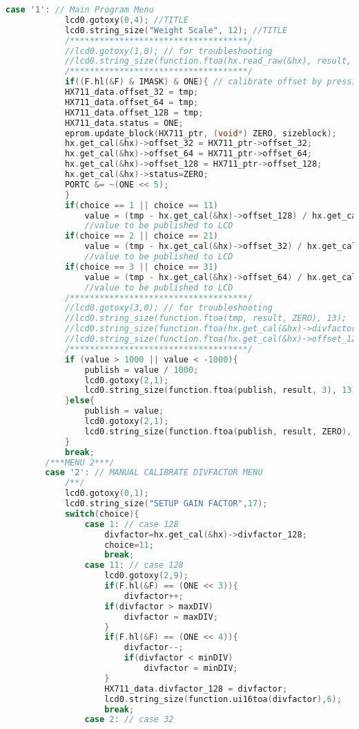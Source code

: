 \begin{lstlisting}[language=C, caption={main.c}, label=main-c, captionpos=b]
		case '1': // Main Program Menu
			lcd0.gotoxy(0,4); //TITLE
			lcd0.string_size("Weight Scale", 12); //TITLE
			/************************************/
			//lcd0.gotoxy(1,0); // for troubleshooting
			//lcd0.string_size(function.ftoa(hx.read_raw(&hx), result, ZERO), 13);
			/************************************/
			if((F.hl(&F) & IMASK) & ONE){ // calibrate offset by pressing button 1
			HX711_data.offset_32 = tmp;
			HX711_data.offset_64 = tmp;
			HX711_data.offset_128 = tmp;
			HX711_data.status = ONE;
			eprom.update_block(HX711_ptr, (void*) ZERO, sizeblock);
			hx.get_cal(&hx)->offset_32 = HX711_ptr->offset_32;
			hx.get_cal(&hx)->offset_64 = HX711_ptr->offset_64;
			hx.get_cal(&hx)->offset_128 = HX711_ptr->offset_128;
			hx.get_cal(&hx)->status=ZERO;
			PORTC &= ~(ONE << 5);
			}
			if(choice == 1 || choice == 11)
				value = (tmp - hx.get_cal(&hx)->offset_128) / hx.get_cal(&hx)->divfactor_128; 
				//value to be published to LCD
			if(choice == 2 || choice == 21)
				value = (tmp - hx.get_cal(&hx)->offset_32) / hx.get_cal(&hx)->divfactor_32; 
				//value to be published to LCD
			if(choice == 3 || choice == 31)
				value = (tmp - hx.get_cal(&hx)->offset_64) / hx.get_cal(&hx)->divfactor_64; 
				//value to be published to LCD
			/************************************/
			//lcd0.gotoxy(3,0); // for troubleshooting
			//lcd0.string_size(function.ftoa(tmp, result, ZERO), 13);
			//lcd0.string_size(function.ftoa(hx.get_cal(&hx)->divfactor_128, result, ZERO), 13);
			//lcd0.string_size(function.ftoa(hx.get_cal(&hx)->offset_128, result, ZERO), 13);
			/************************************/
			if (value > 1000 || value < -1000){
				publish = value / 1000;
				lcd0.gotoxy(2,1);
				lcd0.string_size(function.ftoa(publish, result, 3), 13); lcd0.string_size("Kg", 4);
			}else{
				publish = value;
				lcd0.gotoxy(2,1);
				lcd0.string_size(function.ftoa(publish, result, ZERO), 13); lcd0.string_size("gram", 4);
			}
			break;
		/***MENU 2***/
		case '2': // MANUAL CALIBRATE DIVFACTOR MENU
			/**/
			lcd0.gotoxy(0,1);
			lcd0.string_size("SETUP GAIN FACTOR",17);
			switch(choice){
				case 1: // case 128
					divfactor=hx.get_cal(&hx)->divfactor_128;
					choice=11;
					break;
				case 11: // case 128
					lcd0.gotoxy(2,9);
					if(F.hl(&F) == (ONE << 3)){
						divfactor++;
					if(divfactor > maxDIV)
						divfactor = maxDIV;
					}
					if(F.hl(&F) == (ONE << 4)){
						divfactor--;
						if(divfactor < minDIV)
							divfactor = minDIV;
					}
					HX711_data.divfactor_128 = divfactor;
					lcd0.string_size(function.ui16toa(divfactor),6);
					break;
				case 2: // case 32

\end{lstlisting}
